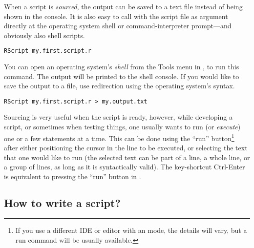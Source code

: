 \documentclass[krantz2]{krantz}\usepackage{knitr}%
\begin{document}
When a script is \emph{sourced}, the output can be saved to a text file instead of being shown in the console. It is also easy to call \Rpgrm with the script file as argument directly at the operating system shell or command-interpreter prompt---and obviously also shell scripts.
\begin{shaded}
\footnotesize
\begin{verbatim}
RScript my.first.script.r
\end{verbatim}
\end{shaded}

You can open an operating system's \emph{shell} from the Tools menu in \RStudio, to run this command. The output will be printed to the shell console. If you would like to save the output to a file, use redirection using the operating system's syntax.
\begin{shaded}
\footnotesize
\begin{verbatim}
RScript my.first.script.r > my.output.txt
\end{verbatim}
\end{shaded}

Sourcing is very useful when the script is ready, however, while developing a script, or sometimes when testing things, one usually wants to run (or \emph{execute}) one or a few statements at a time. This can be done using the ``run'' button\footnote{If you use a different IDE or editor with an \Rlang mode, the details will vary, but a run command will be usually available.} after either positioning the cursor in the line to be executed, or selecting the text that one would like to run (the selected text can be part of a line, a whole line, or a group of lines, as long as it is syntactically valid). The key-shortcut Ctrl-Enter is equivalent to pressing the ``run'' button in \RStudio.

\subsection{How to write a script?}\label{sec:script:writing}
\end{document}
